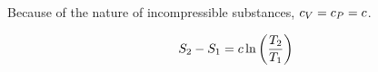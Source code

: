 Because of the nature of incompressible substances, $c_{V} = c_{P} = c$.

\begin{equation}\label{eq:Entropy_Change-Incompressible_Substances}
  S_{2} - S_{1} = c \ln \left( \frac{T_{2}}{T_{1}} \right)
\end{equation}

